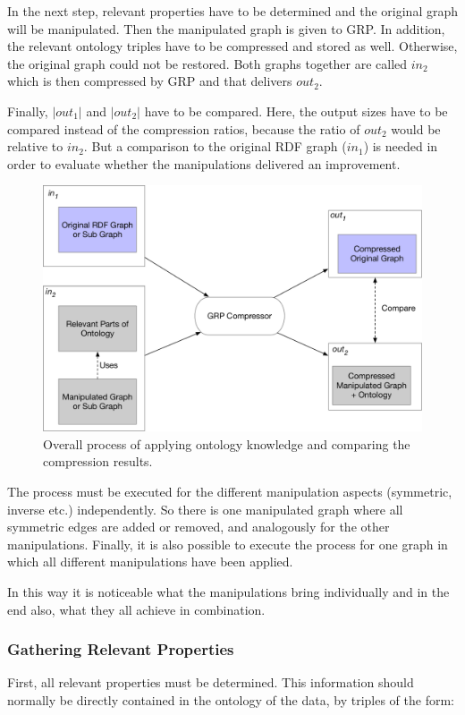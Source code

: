 In the next step, relevant properties have to be determined and the original graph will be manipulated. Then the manipulated graph is given to GRP. In addition, the relevant ontology triples have to be compressed and stored as well. Otherwise, the original graph could not be restored. Both graphs together are called $in_2$ which is then compressed by GRP and that delivers $out_2$.

Finally, $|out_1|$ and $|out_2|$ have to be compared. Here, the output sizes have to be compared instead of the compression ratios, because the ratio of $out_2$ would be relative to $in_2$. But a comparison to the original RDF graph ($in_1$) is needed in order to evaluate whether the manipulations delivered an improvement.

\begin{figure}
	\centering
	\includegraphics[width=0.9\linewidth]{figures/4_implementation/overallProcess}
	\caption{Overall process of applying ontology knowledge and comparing the compression results.}
	\label{fig:overallprocess}
\end{figure}

The process must be executed for the different manipulation aspects (symmetric, inverse etc.) independently. So there is one manipulated graph where all symmetric edges are added or removed, and analogously for the other manipulations. Finally, it is also possible to execute the process for one graph in which all different manipulations have been applied. 

In this way it is noticeable what the manipulations bring individually and in the end also, what they all achieve in combination.


\subsubsection{Gathering Relevant Properties}
First, all relevant properties must be determined. This information should normally be directly contained in the ontology of the data, by triples of the form:

